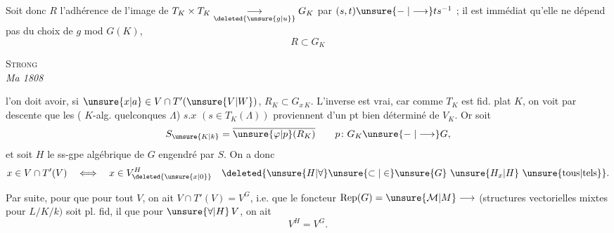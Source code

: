 Soit donc $R$ \unsure{:} l'adhérence de l'image de $T_K\times T_K\underset{\deleted{\unsure{g|u}}}{\longrightarrow}G_K$ par $(s,t)\unsure{\mathrel{-}|\longrightarrow}ts^{-1}$ ; il est immédiat qu'elle ne dépend pas du choix de $g$ mod $G(K)$, 
\[
\boxed{R\subset G_K}
\]
{\centering \textsc{ Strong}\\
\textit{Ma 1808}\par}
l'on doit avoir, si $\unsure{x|a}\in V\cap T'(\unsure{V|W})$, $R_K\subset G_{x\,K}$. L'inverse est vrai, car comme $T_K$ est fid. plat  $K$, on voit par descente que les  ( $K$-alg. quelconques $\Lambda$) $s.x$ $(s\in T_K(\Lambda))$ proviennent d'un pt bien déterminé de $V_K$. Or soit \deleted{\unsure{$\xi$}}
\[
S_{\unsure{K|k}}=\overline{\unsure{\varphi|p}(R_K)}\qquad p\colon G_K\unsure{\mathrel{-}|\longrightarrow}G,
\]
et soit $H$ le ss-gpe algébrique  de $G$ engendré par $S$. On a donc
\[
x\in V\cap T'(V)\quad\Longleftrightarrow\quad x\in V_{\deleted{\unsure{x|0}}}^{H}\quad \deleted{\unsure{H|\forall}\unsure{\subset|\in}\unsure{G}\ \unsure{H_x|H}\ \text{\unsure{tous|tels}}}.
\]

Par suite, pour que  pour tout $V$, on ait $V\cap T'(V)=V^G$, i.e. que le foncteur $\mathrm{Rep}(G)=\unsure{\mathcal M|M}\longrightarrow$ (structures vectorielles mixtes pour $L/K/k)$ soit pl. fid, il  que pour $\unsure{\forall|H}\,V$,  on ait
\[
V^H=V^G.
\]

